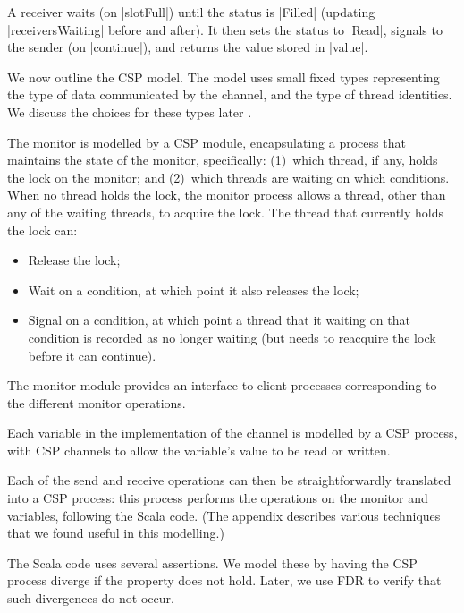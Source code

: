 A receiver waits (on |slotFull|) until the status is |Filled| (updating
|receiversWaiting| before and after).  It then sets the status to |Read|,
signals to the sender (on |continue|), and returns the value stored in
|value|.

We now outline the CSP model.  The model uses small fixed types representing
the type of data communicated by the channel, and the type of thread
identities.  We discuss the choices for these types later . 

The monitor is modelled by a CSP module, encapsulating a process that
maintains the state of the monitor, specifically: (1)~which thread, if any,
holds the lock on the monitor; and (2)~which threads are waiting on which
conditions.  When no thread holds the lock, the monitor process allows a
thread, other than any of the waiting threads, to acquire the lock.  The
thread that currently holds the lock can:
\begin{itemize}
\item Release the lock;
\item Wait on a condition, at which point it also releases the lock;
\item Signal on a condition, at which point a thread that it waiting on that
  condition is recorded as no longer waiting (but needs to reacquire the lock
  before it can continue).
\end{itemize}
%
The monitor module provides an interface to client processes corresponding to
the different monitor operations.

Each variable in the implementation of the channel is modelled by a CSP
process, with CSP channels to allow the variable's value to be read or
written.

Each of the send and receive operations can then be straightforwardly
translated into a CSP process: this process performs the operations on the
monitor and variables, following the Scala code.  (The appendix describes
various techniques that we found useful in this modelling.)

The Scala code uses several assertions.  We model these by having the CSP
process diverge if the property does not hold.  Later, we use FDR to verify
that such divergences do not occur.  

